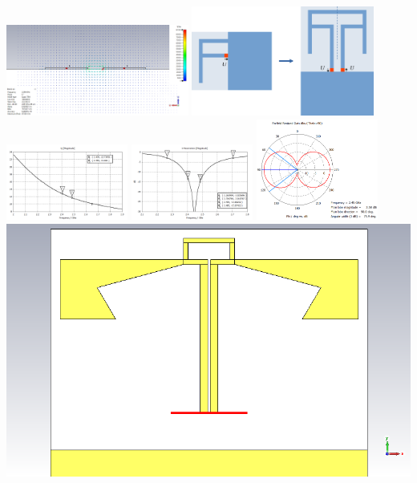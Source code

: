 \documentclass[aspectratio=169]{beamer}
\begin{document}
\begin{frame}
	\centering
		\begin{columns}
		\centering
				\centering
				\includegraphics[width=0.45\textwidth]{e1_2.png}
				\includegraphics[width=0.45\textwidth]{ifa-bifa.pdf}
				\includegraphics[width=0.3\textwidth]{bifa_broadband_QZ.png}
				\includegraphics[width=0.3\textwidth]{bifa_broadband_S11_dB.png}
				\includegraphics[width=0.3\textwidth]{bifa_broadband_pattern_theta90.png}
				\centering
				\includegraphics[width=\textwidth]{bifa_broadband_3D.png}\\

\end{columns}
\end{frame}
\end{document}
